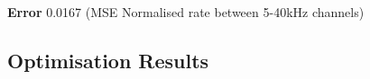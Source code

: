 \textbf{Error} 0.0167  (MSE Normalised rate between 5-40kHz channels)



\subsection{Optimisation Results}







